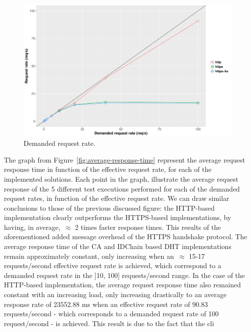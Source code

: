 \begin{figure}
  \centering
  \includegraphics[scale=0.4]{Figures/evaluation/request-rate-writes-linear.pdf}
  \caption{Demanded request rate.}
\label{fig:demanded-request-rate}
\end{figure}

The graph from Figure~\ref{fig:average-response-time} represent the average request response time in function of the effective request rate, for each of the implemented solutions.
Each point in the graph, illustrate the average request response of the 5 different test executions performed for each of the demanded request rates, in function of the effective request rate.
We can draw similar conclusions to those of the previous discussed figure: the HTTP-based implementation clearly outperforms the HTTPS-based implementations, by having, in average,~$\approx$ 2 times faster response times.
This results of the aforementioned added message overhead of the HTTPS handshake protocol.
The average response time of the CA and IDChain based DHT implementations remain approximately constant, only increasing when an~$\approx$ 15-17 requests/second effective request rate is achieved, which correspond to a demanded request rate in the ]10, 100] requests/second range.
In the case of the HTTP-based implementation, the average request response time also remained constant with an increasing load, only increasing drastically to an average response rate of 23552.88 ms when an effective request rate of 90.83 requests/second - which corresponds to a demanded request rate of 100 request/second - is achieved.
This result is due to the fact that the cli

